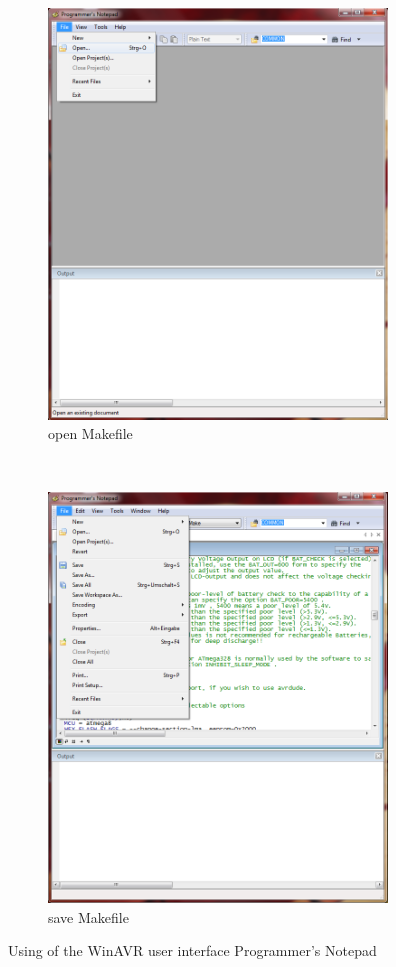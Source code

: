 \begin{figure}[H]
  \begin{subfigure}[b]{9cm}
    \centering
    \includegraphics[width=9cm]{../PNG/Notepad_open.png}
    \caption{open Makefile}
  \end{subfigure}
  ~
  \begin{subfigure}[b]{9cm}
    \centering
    \includegraphics[width=9cm]{../PNG/Notepad_save.png}
    \caption{save Makefile}
  \end{subfigure}
  \caption{Using of the WinAVR user interface Programmer's Notepad}
  \label{fig:WinAVR1}
\end{figure}

